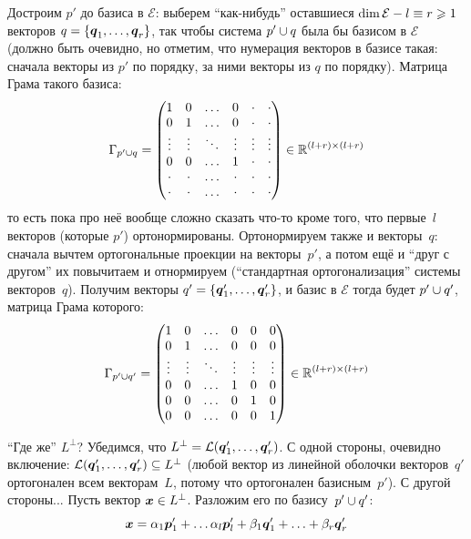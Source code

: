 \documentclass[a4paper,12pt]{article}
\begin{document}
  Достроим $p'$ до базиса в $\mathcal E$: выберем ``как-нибудь'' оставшиеся $\dim \mathcal E \hm- l \hm\equiv r \hm\geq 1$ векторов $q \hm= \{\bds q_1, \ldots, \bds q_r\}$, так чтобы система $p' \hm\cup q$ была бы базисом в $\mathcal E$ (должно быть очевидно, но отметим, что нумерация векторов в базисе такая: сначала векторы из $p'$ по порядку, за ними векторы из $q$ по порядку).
  Матрица Грама такого базиса:
  \[
    \Gamma_{p' \cup q} = \begin{pmatrix}
      1      & 0      & \ldots & 0      & \cdot  & \cdot\\
      0      & 1      & \ldots & 0      & \cdot  & \cdot\\
      \vdots & \vdots & \ddots & \vdots & \vdots & \vdots\\
      0      & 0      & \ldots & 1      & \cdot  & \cdot\\
      \cdot  & \cdot  & \ldots & \cdot  & \cdot  & \cdot\\
      \cdot  & \cdot  & \ldots & \cdot  & \cdot  & \cdot
    \end{pmatrix} \in \operatorname{\mathbb R}^{(l + r) \times (l + r)}
  \]
  то есть пока про неё вообще сложно сказать что-то кроме того, что первые~$l$ векторов (которые $p'$) ортонормированы.
  Ортонормируем также и векторы~$q$: сначала вычтем ортогональные проекции на векторы~$p'$, а потом ещё и ``друг с другом'' их повычитаем и отнормируем (``стандартная ортогонализация'' системы векторов~$q$).
  Получим векторы $q' \hm= \{\bds q_1', \ldots, \bds q_r'\}$, и базис в $\mathcal E$ тогда будет $p' \hm\cup q'$, матрица Грама которого:
  \[
    \Gamma_{p' \cup q'} = \begin{pmatrix}
      1      & 0      & \ldots & 0      & 0      & 0\\
      0      & 1      & \ldots & 0      & 0      & 0\\
      \vdots & \vdots & \ddots & \vdots & \vdots & \vdots\\
      0      & 0      & \ldots & 1      & 0      & 0\\
      0      & 0      & \ldots & 0      & 1      & 0\\
      0      & 0      & \ldots & 0      & 0      & 1
    \end{pmatrix} \in \operatorname{\mathbb R}^{(l + r) \times (l + r)}
  \]
  
  ``Где же'' $L^{\perp}$?
  Убедимся, что $L^{\perp} \hm= \mathcal L(\bds q_1', \ldots, \bds q_r')$.
  С одной стороны, очевидно включение: $\mathcal L(\bds q_1', \ldots, \bds q_r') \hm\subseteq L^{\perp}$ (любой вектор из линейной оболочки векторов~$q'$ ортогонален всем векторам~$L$, потому что ортогонален базисным~$p'$).
  С другой стороны...
  Пусть вектор $\bds x \hm\in L^{\perp}$.
  Разложим его по базису~$p' \hm\cup q'$:
  \[
    \boldsymbol x = \alpha_1 \boldsymbol p_1' + \ldots \alpha_l \boldsymbol p_l' + \beta_1 \boldsymbol q_1' + \ldots + \beta_r \boldsymbol q_r'
  \]
  
\end{document}
